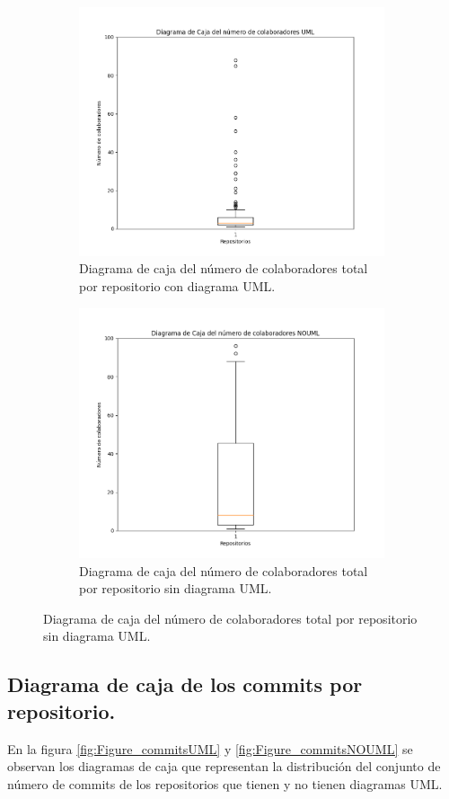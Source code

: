 \documentclass[a4paper, 12pt]{book}
\begin{document}
\begin{figure}
  \centering
  \begin{subfigure}{0.45\linewidth}
    \centering
    \includegraphics[width=9cm, keepaspectratio]{img/Figure_contributorsUML.png}
    \caption{Diagrama de caja del número de colaboradores total por repositorio con diagrama UML. }\label{fig:Figure_contributorsUML}
  \end{subfigure}
  \hfill
    \begin{subfigure}{0.45\linewidth}
      \centering
      \includegraphics[width=9cm, keepaspectratio]{img/Figure_contributorsNOUML.png}
      \caption{Diagrama de caja del número de colaboradores total por repositorio sin diagrama UML.}\label{fig:Figure_contributorsNOUML}
  \end{subfigure}
\end{figure}

\subsection{Diagrama de caja de los commits por repositorio.}
\label{sec:Diagrama de caja de los commits por repositorio}
En la figura \ref{fig:Figure_commitsUML} y \ref{fig:Figure_commitsNOUML} se observan los diagramas de caja que representan la distribución del conjunto de número de commits de los repositorios que tienen y no tienen diagramas UML.
\end{document}
